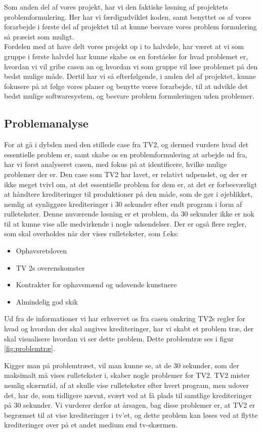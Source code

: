 Som anden del af vores projekt, har vi den faktiske løsning af projektets problemformulering. Her har vi færdigudviklet koden, samt benyttet os af vores forarbejde i første del af projektet til at kunne besvare vores problem formulering så præcist som muligt.\\
Fordelen med at have delt vores projekt op i to halvdele, har været at vi som gruppe i første halvdel har kunne skabe os en forståelse for hvad problemet er, hvordan vi vil gribe casen an og hvordan vi som gruppe vil løse problemet på den bedst mulige måde. Dertil har vi så efterfølgende, i anden del af projektet, kunne fokusere på at følge vores planer og benytte vores forarbejde, til at udvikle det bedst mulige softwaresystem, og besvare problem formuleringen uden problemer.

\subsection{Problemanalyse}
For at gå i dybden med den stillede case fra TV2, og dermed vurdere hvad det essentielle problem er, samt skabe os en problemformulering at arbejde ud fra, har vi først analyseret casen, med fokus på at identificere, hvilke mulige problemer der er. Den case som TV2 har lavet, er relativt udpenslet, og der er ikke meget tvivl om, at det essentielle problem for dem er, at det er forbesværligt at håndtere krediteringer til produktioner på den måde, som de gør i øjeblikket, nemlig at synliggøre krediteringer i 30 sekunder efter endt program i form af rulletekster. Denne nuværende løsning er et problem, da 30 sekunder ikke er nok til at kunne vise alle medvirkende i nogle udsendelser. \cite{url_case} Der er også flere regler, som skal overholdes når der vises rulletekster, som f.eks:
\begin{itemize}
    \item Ophavsretsloven
    \item TV 2s overenskomster
    \item Kontrakter for ophavsmænd og udøvende kunstnere
    \item Almindelig god skik
\end{itemize}
Ud fra de informationer vi har erhvervet os fra casen omkring TV2s regler for hvad og hvordan der skal angives krediteringer, har vi skabt et problem træ, der skal visualisere hvordan vi ser dette problem. Dette problemtræ ses i figur \ref{fig:problemtræ}. 

Kigger man på problemtræet, vil man kunne se, at de 30 sekunder, som der maksimalt må vises rulletekster i, skaber nogle problemer for TV2. TV2 mister nemlig skærmtid, af at skulle vise rulletekster efter hvert program, men udover det, har de, som tidligere nævnt, svært ved at få plads til samtlige krediteringer på 30 sekunder. Vi vurderer derfor at årsagen, bag disse problemer er, at TV2 er begrænset til at vise krediteringer i tv'et, og dette problem kan løses ved at flytte krediteringer over på et andet medium end tv-skærmen. 

